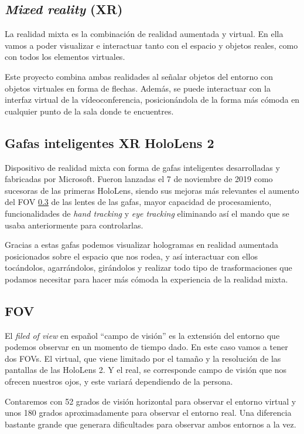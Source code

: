 \subsection{\textit{Mixed reality} (XR)}

La realidad mixta \cite{wiki:xr,microsoft:xr} es la combinación de realidad aumentada y virtual. En ella vamos a poder visualizar e interactuar tanto con el espacio y objetos reales, como con todos los elementos virtuales. 

Este proyecto combina ambas realidades al señalar objetos del entorno con objetos virtuales en forma de flechas. Además, se puede interactuar con la interfaz virtual de la vídeoconferencia, posicionándola de la forma más cómoda en cualquier punto de la sala donde te encuentres.

\subsection{Gafas inteligentes XR HoloLens 2}

Dispositivo de realidad mixta con forma de gafas inteligentes desarrolladas y fabricadas por Microsoft. Fueron lanzadas el 7 de noviembre de 2019 como sucesoras de las primeras HoloLens, siendo sus mejoras más relevantes el aumento del FOV \ref{sub:fov} de las lentes de las gafas, mayor capacidad de procesamiento, funcionalidades de \textit{hand tracking} y \textit{eye tracking} eliminando así el mando que se usaba anteriormente para controlarlas.

Gracias a estas gafas podemos visualizar hologramas en realidad aumentada posicionados sobre el espacio que nos rodea, y así interactuar con ellos tocándolos, agarrándolos, girándolos y realizar todo tipo de trasformaciones que podamos necesitar para hacer más cómoda la experiencia de la realidad mixta.


\subsection{FOV}\label{sub:fov}

El \textit{filed of view} \cite{unity:fov} en español “campo de visión” es la extensión del entorno que podemos observar en un momento de tiempo dado. En este caso vamos a tener dos FOVs. El virtual, que viene limitado por el tamaño y la resolución de las pantallas de las HoloLens 2. Y el real, se corresponde campo de visión que nos ofrecen nuestros ojos, y este variará dependiendo de la persona.

Contaremos con 52 grados de visión horizontal para observar el entorno virtual y unos 180 grados aproximadamente para observar el entorno real. Una diferencia bastante grande que generara dificultades para observar ambos entornos a la vez.


